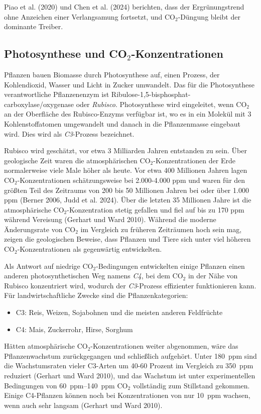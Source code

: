 \documentclass[12pt,paper=a4,DIV=12,parskip=never,chapterprefix=false,headings=standardclasses]{scrreprt}
\begin{document}
Piao et al. (2020) und Chen et al. (2024) berichten, dass der Ergrünungstrend ohne Anzeichen einer Verlangsamung fortsetzt, und CO$_2$-Düngung bleibt der dominante Treiber.

\subsection{Photosynthese und CO$_2$-Konzentrationen}

Pflanzen bauen Biomasse durch Photosynthese auf, einen Prozess, der Kohlendioxid, Wasser und Licht in Zucker umwandelt. Das für die Photosynthese verantwortliche Pflanzenenzym ist Ribulose-1,5-bisphosphat-carboxylase/oxygenase oder \emph{Rubisco}. Photosynthese wird eingeleitet, wenn CO$_2$ an der Oberfläche des Rubisco-Enzyms verfügbar ist, wo es in ein Molekül mit 3 Kohlenstoffatomen umgewandelt und danach in die Pflanzenmasse eingebaut wird. Dies wird als \emph{C3}-Prozess bezeichnet.

Rubisco wird geschätzt, vor etwa 3 Milliarden Jahren entstanden zu sein. Über geologische Zeit waren die atmosphärischen CO$_2$-Konzentrationen der Erde normalerweise viele Male höher als heute. Vor etwa 400 Millionen Jahren lagen CO$_2$-Konzentrationen schätzungsweise bei 2.000-4.000 ppm und waren für den größten Teil des Zeitraums von 200 bis 50 Millionen Jahren bei oder über 1.000 ppm (Berner 2006, Judd et al. 2024). Über die letzten 35 Millionen Jahre ist die atmosphärische CO$_2$-Konzentration stetig gefallen und fiel auf bis zu 170 ppm während Vereisung (Gerhart und Ward 2010). Während die moderne Änderungsrate von CO$_2$ im Vergleich zu früheren Zeiträumen hoch sein mag, zeigen die geologischen Beweise, dass Pflanzen und Tiere sich unter viel höheren CO$_2$-Konzentrationen als gegenwärtig entwickelten.

Als Antwort auf niedrige CO$_2$-Bedingungen entwickelten einige Pflanzen einen anderen photosynthetischen Weg namens \emph{C4}, bei dem CO$_2$ in der Nähe von Rubisco konzentriert wird, wodurch der \emph{C3}-Prozess effizienter funktionieren kann. Für landwirtschaftliche Zwecke sind die Pflanzenkategorien:
\begin{itemize}
\item C3: Reis, Weizen, Sojabohnen und die meisten anderen Feldfrüchte
\item C4: Mais, Zuckerrohr, Hirse, Sorghum	
\end{itemize}

Hätten atmosphärische CO$_2$-Konzentrationen weiter abgenommen, wäre das Pflanzenwachstum zurückgegangen und schließlich aufgehört. Unter \SI{180}{ppm} sind die Wachstumsraten vieler C3-Arten um 40-60 Prozent im Vergleich zu \SI{350}{ppm} reduziert (Gerhart und Ward 2010), und das Wachstum ist unter experimentellen Bedingungen von \SIrange{60}{140}{ppm} CO$_2$ vollständig zum Stillstand gekommen. Einige C4-Pflanzen können noch bei Konzentrationen von nur \SI{10}{ppm} wachsen, wenn auch sehr langsam (Gerhart und Ward 2010).
\end{document}
